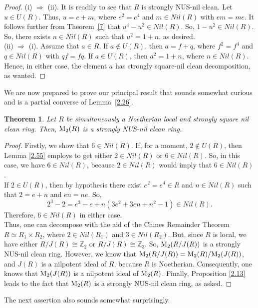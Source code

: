 \documentclass[12pt]{amsart}
\newtheorem{theorem}{Theorem}[section]
\theoremstyle{definition}
\begin{document}
\begin{proof}
(i) $\Rightarrow$ (ii). It is readily to see that $R$ is strongly NUS-nil clean. Let $u\in U(R)$. Thus, $u=e+m$, where $e^2=e^4$ and $m\in Nil(R)$ with $em=me$. It follows further from Theorem~\ref{7} that $u^4-u^2\in Nil(R)$. So, $1-u^2\in Nil(R)$. So, there exists $n\in Nil(R)$ such that $u^2=1+n$, as desired.\\
(ii) $\Rightarrow$ (i). Assume that  $a\in R$. If $a\not\in U(R)$, then $a=f+q$, where $f^2=f^4$ and $q\in Nil(R)$ with $qf=fq$. If $a\in U(R)$, then $a^2=1+n$, where $n\in Nil(R)$. Hence, in either case, the element $a$ has strongly  square-nil clean decomposition, as wanted.
\end{proof}

We are now prepared to prove our principal result that sounds somewhat curious and is a partial converse of Lemma~\ref{2.26}.

\begin{theorem}\label{2.38}
Let $R$ be simultaneously a Noetherian local and strongly square nil clean ring. Then, ${\rm M}_2(R)$ is a strongly NUS-nil clean ring.
\end{theorem}

\begin{proof}
Firstly, we show that $6\in Nil(R)$. If, for a moment, $2\not\in U(R)$, then Lemma \ref{2.55} employs to get either $2\in Nil(R)$ or $6\in Nil(R)$. So, in this case, we have $6\in Nil(R)$, because $2\in Nil(R)$ would imply that $6\in Nil(R)$.\\
If $2\in U(R)$, then by hypothesis there exist $e^2=e^4\in R$ and $n\in Nil(R)$ such that $2=e+n$ and $en=ne$. So, $$2^3-2=e^3-e+n(3e^2+3en+n^2-1)\in Nil(R).$$ Therefore, $6\in Nil(R)$ in either case.\\ Thus, one can decompose with the aid of the Chines Remainder Theorem $R\simeq R_1 \times  R_2$, where $2\in Nil(R_1)$ and $3\in Nil(R_2)$. But, since $R$ is local, we have either $R/J(R) \cong \mathbb{Z}_2$ or $R/J(R) \cong \mathbb{Z}_3$. So, ${\rm M}_2(R/J(R))$ is a strongly NUS-nil clean ring. However, we know that ${\rm M}_2(R/J(R)) = {\rm M}_2(R)/{\rm M}_2(J(R))$, and $J(R)$ is a nilpotent ideal of $R$, because $R$ is Noetherian. Consequently, one knows that ${\rm M}_2(J(R))$ is a nilpotent ideal of ${\rm M}_2(R)$. Finally, Proposition \ref{2.13} leads to the fact that ${\rm M}_2(R)$ is a strongly NUS-nil clean ring, as asked.
\end{proof}

The next assertion also sounds somewhat surprisingly.
\end{document}
